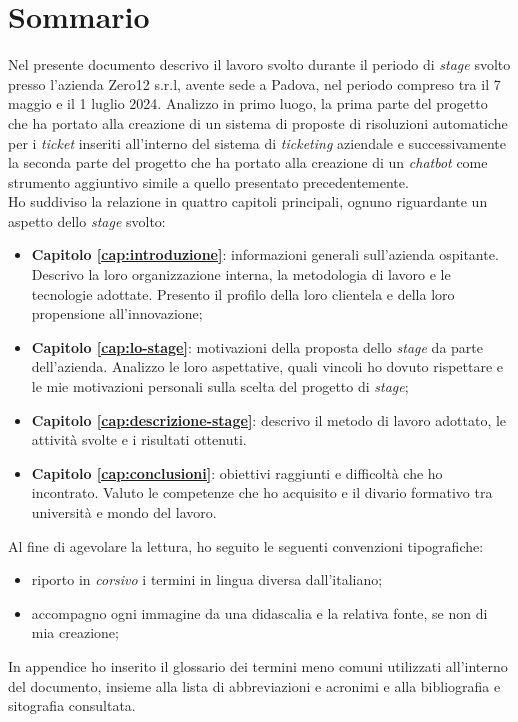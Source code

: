 \cleardoublepage
{}
{}
\begingroup
\let\clearpage\relax
\let\cleardoublepage\relax
\let\cleardoublepage\relax
\chapter*{Sommario}
Nel presente documento descrivo il lavoro svolto durante il periodo di \textit{stage} svolto presso l'azienda Zero12 s.r.l, avente sede a Padova, nel periodo compreso tra il 7 maggio e il 1 luglio 2024.
Analizzo in primo luogo, la prima parte del progetto che ha portato alla creazione di un sistema di proposte di risoluzioni automatiche per i \textit{ticket} inseriti all'interno del sistema di \textit{ticketing} aziendale e successivamente la seconda parte del progetto che ha portato alla creazione di un \textit{chatbot} come strumento aggiuntivo simile a quello presentato precedentemente. \\
Ho suddiviso la relazione in quattro capitoli principali, ognuno riguardante un aspetto dello \textit{stage} svolto: 
\begin{itemize}
    \item \textbf{Capitolo \ref{cap:introduzione}}: informazioni generali sull'azienda ospitante. Descrivo la loro organizzazione interna, la metodologia di lavoro e le tecnologie adottate. Presento il profilo della loro clientela e della loro propensione all'innovazione;
    \item \textbf{Capitolo \ref{cap:lo-stage}}: motivazioni della proposta dello \textit{stage} da parte dell'azienda. Analizzo le loro aspettative, quali vincoli ho dovuto rispettare e le mie motivazioni personali sulla scelta del progetto di \textit{stage};
    \item \textbf{Capitolo \ref{cap:descrizione-stage}}: descrivo il metodo di lavoro adottato, le attività svolte e i risultati ottenuti. 
    \item \textbf{Capitolo \ref{cap:conclusioni}}: obiettivi raggiunti e difficoltà che ho incontrato. Valuto le competenze che ho acquisito e il divario formativo tra università e mondo del lavoro.
\end{itemize}
\noindent
Al fine di agevolare la lettura, ho seguito le seguenti convenzioni tipografiche:
\begin{itemize}
    \item riporto in \textit{corsivo} i termini in lingua diversa dall'italiano;
    \item accompagno ogni immagine da una didascalia e la relativa fonte, se non di mia creazione;
\end{itemize}
\noindent
In appendice ho inserito il glossario dei termini meno comuni utilizzati all'interno del documento, insieme alla lista di abbreviazioni e acronimi e alla bibliografia e sitografia consultata.


\endgroup

\vfill
